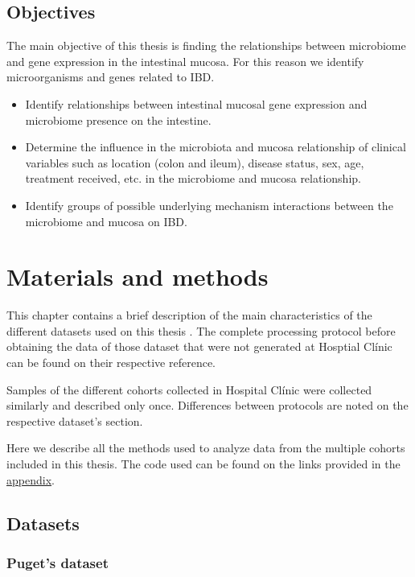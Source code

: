 \documentclass[
  12pt,
  a4paper,
  twoside,
  openright]{book}
\begin{document}
\hypertarget{objectives}{%
\section{Objectives}\label{objectives}}

The main objective of this thesis is finding the relationships between microbiome and gene expression in the intestinal mucosa. For this reason we identify microorganisms and genes related to IBD.

\begin{itemize}
\item
  Identify relationships between intestinal mucosal gene expression and microbiome presence on the intestine.
\item
  Determine the influence in the microbiota and mucosa relationship of clinical variables such as location (colon and ileum), disease status, sex, age, treatment received, etc. in the microbiome and mucosa relationship.
\item
  Identify groups of possible underlying mechanism interactions between the microbiome and mucosa on IBD.
\end{itemize}

\hypertarget{materials-and-methods}{%
\chapter{Materials and methods}\label{materials-and-methods}}

This chapter contains a brief description of the main characteristics of the different datasets used on this thesis .
The complete processing protocol before obtaining the data of those dataset that were not generated at Hosptial Clínic can be found on their respective reference.

Samples of the different cohorts collected in Hospital Clínic were collected similarly and described only once.
Differences between protocols are noted on the respective dataset's section.

Here we describe all the methods used to analyze data from the multiple cohorts included in this thesis.
The code used can be found on the links provided in the \protect\hyperlink{software}{appendix}.

\hypertarget{datasets}{%
\section{Datasets}\label{datasets}}

\hypertarget{methods-puget}{%
\subsection{Puget's dataset}\label{methods-puget}}
\end{document}
